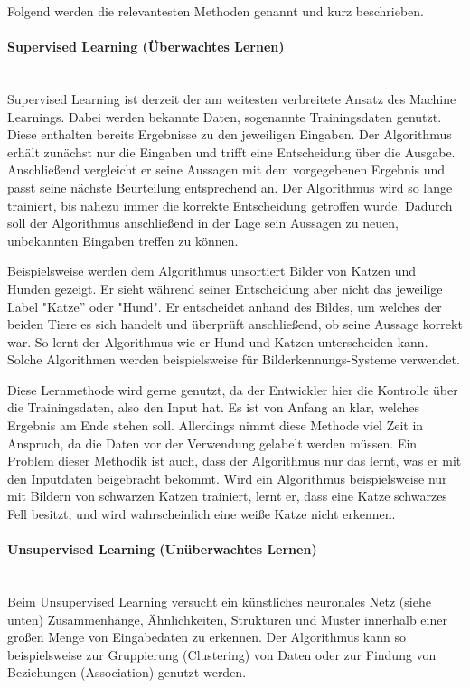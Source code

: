 \documentclass[a4paper,12pt, german]{report}
\begin{document}
Folgend werden die relevantesten Methoden genannt und kurz beschrieben. \cite{10}


\paragraph{Supervised Learning (Überwachtes Lernen)} $ $ \\ Supervised Learning ist derzeit der am weitesten verbreitete Ansatz des Machine Learnings. Dabei werden bekannte Daten, sogenannte Trainingsdaten genutzt. Diese enthalten bereits Ergebnisse zu den jeweiligen Eingaben. Der Algorithmus erhält zunächst nur die Eingaben und trifft eine Entscheidung über die Ausgabe. Anschließend vergleicht er seine Aussagen mit dem vorgegebenen Ergebnis und passt seine nächste Beurteilung entsprechend an. Der Algorithmus wird so lange trainiert, bis nahezu immer die korrekte Entscheidung getroffen wurde. Dadurch soll der Algorithmus anschließend in der Lage sein Aussagen zu neuen, unbekannten Eingaben treffen zu können.\cite{01}\cite{05}

Beispielsweise werden dem Algorithmus unsortiert Bilder von Katzen und Hunden gezeigt. Er sieht während seiner Entscheidung aber nicht das jeweilige Label "Katze'' oder "Hund". Er entscheidet anhand des Bildes, um welches der beiden Tiere es sich handelt und überprüft anschließend, ob seine Aussage korrekt war. So lernt der Algorithmus wie er Hund und Katzen unterscheiden kann. Solche Algorithmen werden beispielsweise für Bilderkennungs-Systeme verwendet. 

Diese Lernmethode wird gerne genutzt, da der Entwickler hier die Kontrolle über die Trainingsdaten, also den Input hat. Es ist von Anfang an klar, welches Ergebnis am Ende stehen soll. Allerdings nimmt diese Methode viel Zeit in Anspruch, da die Daten vor der Verwendung gelabelt werden müssen. Ein Problem dieser Methodik ist auch, dass der Algorithmus nur das lernt, was er mit den Inputdaten beigebracht bekommt. Wird ein Algorithmus beispielsweise nur mit Bildern von schwarzen Katzen trainiert, lernt er, dass eine Katze schwarzes Fell besitzt, und wird wahrscheinlich eine weiße Katze nicht erkennen.

\paragraph{Unsupervised Learning (Unüberwachtes Lernen)} $  $ \\ Beim Unsupervised Learning versucht ein künstliches neuronales Netz (siehe unten) Zusammenhänge, Ähnlichkeiten, Strukturen und Muster innerhalb einer großen Menge von Eingabedaten zu erkennen. Der Algorithmus kann so beispielsweise zur Gruppierung (Clustering) von Daten oder zur Findung von Beziehungen (Association) genutzt werden.\cite{01}
\end{document}
